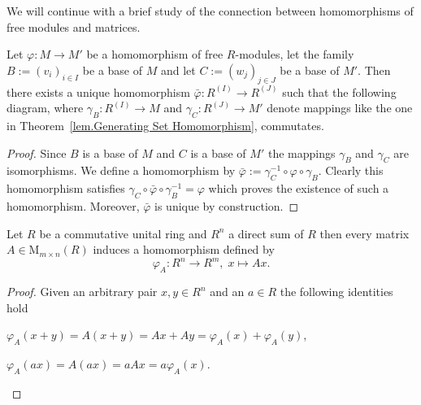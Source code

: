 We will continue with a brief study of the connection between homomorphisms of free modules and matrices.

\begin{pro}\label{prop.Commutative Diagram of Free Modules}
Let $\varphi\colon M\to M'$ be a homomorphism of free $R$-modules, let the family $B:=(v_i)_{i\in I}$ be a base of $M$ and let $C:=(w_j)_{j\in J}$ be a base of $M'$. Then there exists a unique homomorphism $\bar{\varphi}\colon R^{(I)}\to R^{(J)}$ such that the following diagram, where $\gamma_B\colon R^{(I)}\to M$ and $\gamma_C\colon R^{(J)}\to M'$ denote mappings like the one in Theorem~\ref{lem.Generating Set Homomorphism}, commutates.
\begin{center}
\end{center}
\end{pro}
\begin{proof}
Since $B$ is a base of $M$ and $C$ is a base of $M'$ the mappings $\gamma_B$ and $\gamma_C$ are isomorphisms. We define a homomorphism by $\bar{\varphi}:=\gamma_C^{-1}\circ\varphi\circ\gamma_B$. Clearly this homomorphism satisfies $\gamma_C\circ\bar{\varphi}\circ\gamma_B^{-1}=\varphi$ which proves the existence of such a homomorphism. Moreover, $\bar{\varphi}$ is unique by construction.
\end{proof}

\begin{cor}\label{cor.Matrix implies Homomorphism}
Let $R$ be a commutative unital ring and $R^n$ a direct sum of $R$ then every matrix $A\in\mathrm{M}_{m\times n}(R)$ induces a homomorphism defined by
\begin{equation*}
\varphi_A\colon R^n\to R^m,\; x\mapsto Ax.
\end{equation*}
\end{cor}
\begin{proof}
Given an arbitrary pair $x,y\in R^n$ and an $a\in R$ the following identities hold
\begin{exlist}
\item $\varphi_A(x+y)=A(x+y)=Ax+Ay=\varphi_A(x)+\varphi_A(y)$,
\item $\varphi_A(ax)=A(ax)=aAx=a\varphi_A(x)$.
\end{exlist}
\end{proof}

